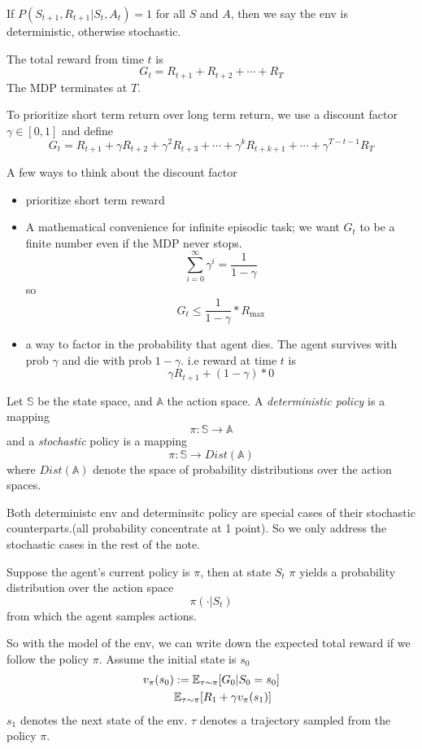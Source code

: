 \documentclass{article}
\begin{document}
If $P(S_{t+1}, R_{t+1}|S_t, A_t) = 1$ for all $S$ and $A$, then we say
the env is deterministic, otherwise stochastic.

The total reward from time $t$ is 
\[
    G_t = R_{t+1} + R_{t+2} + \cdots + R_{T}
\]
The MDP terminates at $T$. 

To prioritize short term return over long term return, we use a 
discount factor $\gamma \in [0, 1]$ and define
\[
    G_t = R_{t+1} + \gamma R_{t+2} + \gamma^2 R_{t+3} + \cdots 
    + \gamma^k R_{t+k+1} + \cdots + \gamma^{T-t-1}R_{T}
\]

A few ways to think about the discount factor
\begin{itemize}
    \item prioritize short term reward
    \item A mathematical convenience for infinite episodic task; we 
        want $G_t$ to be a finite number even if the MDP never stops.
        \[
            \sum_{i=0}^{\infty} \gamma^i = \frac{1}{1-\gamma}
        \]
        so 
        \[
            G_t \le \frac{1}{1-\gamma} * R_{\max}
        \]
    \item a way to factor in the probability that agent dies. The agent 
        survives with prob $\gamma$ and die with prob $1 - \gamma$.
        i.e reward at time $t$ is 
        \[
            \gamma R_{t+1} + (1 - \gamma) * 0
        \]
\end{itemize}

Let $\mathbb{S}$ be the state space, and $\mathbb{A}$ the action space.
A \emph{deterministic policy} is a mapping 
\[
    \pi: \mathbb{S} \rightarrow \mathbb{A}
\]
and a \emph{stochastic} policy is a mapping
\[
    \pi: \mathbb{S} \rightarrow Dist( \mathbb{A} )
\]
where $Dist(\mathbb{ A })$ denote the space of probability distributions
over the action spaces.

Both deterministc env and determinsitc policy are special cases of their
stochastic counterparts.(all probability concentrate at 1 point). So 
we only address the stochastic cases in the rest of the note.

Suppose the agent's current policy is $\pi$, then at state $S_t$
$\pi$ yields a probability distribution over the action space
\[
    \pi(\cdot | S_t)
\]
from which the agent samples actions. 

So with the model of the env, we can write down the expected total 
reward if we follow the policy $\pi$. Assume the initial state is $s_0$
\begin{align*}
    v_{\pi}(s_0) & := \mathbb{E}_{\tau \sim \pi}[G_0 | S_0 = s_0] \\
        & \mathbb{E}_{\tau \sim \pi}[R_1 + \gamma v_{\pi}(s_1)]
\end{align*}
$s_1$ denotes the next state of the env.
$\tau$ denotes a trajectory sampled from the policy $\pi$.
\end{document}
